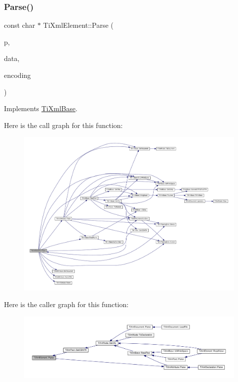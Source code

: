 \subsubsection{\texorpdfstring{Parse()}{Parse()}}
{\footnotesize\ttfamily const char $\ast$ Ti\+Xml\+Element\+::\+Parse (\begin{DoxyParamCaption}\item[{const char $\ast$}]{p,  }\item[{\hyperlink{class_ti_xml_parsing_data}{Ti\+Xml\+Parsing\+Data} $\ast$}]{data,  }\item[{\hyperlink{tinyxml_8h_a88d51847a13ee0f4b4d320d03d2c4d96}{Ti\+Xml\+Encoding}}]{encoding }\end{DoxyParamCaption})\hspace{0.3cm}{\ttfamily [virtual]}}



Implements \hyperlink{class_ti_xml_base_a00e4edb0219d00a1379c856e5a1d2025}{Ti\+Xml\+Base}.

Here is the call graph for this function\+:\nopagebreak
\begin{figure}[H]
\begin{center}
\leavevmode
\includegraphics[width=350pt]{class_ti_xml_element_af95c9165159fd9dfdcc5b894a3fcf85b_cgraph}
\end{center}
\end{figure}
Here is the caller graph for this function\+:\nopagebreak
\begin{figure}[H]
\begin{center}
\leavevmode
\includegraphics[width=350pt]{class_ti_xml_element_af95c9165159fd9dfdcc5b894a3fcf85b_icgraph}
\end{center}
\end{figure}
\mbox{\label{class_ti_xml_element_aa31a15cddfb8601a31236fe7d2569fb4}} 
